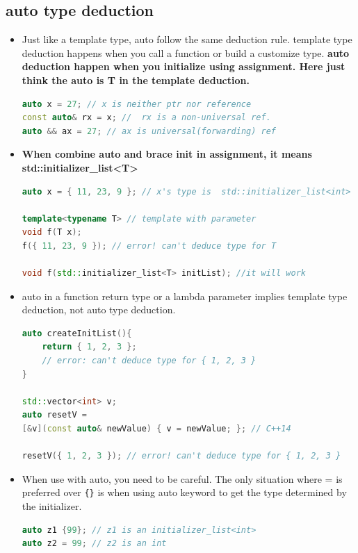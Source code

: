 \documentclass[a4paper,11pt,twoside]{book}
\begin{document}
\subsection{auto type deduction}
\begin{itemize}
	\item Just like a template type, auto follow the same deduction rule. template type deduction happens when you call a function or build a customize type. \textbf{auto deduction happen when you initialize using assignment. Here just think the auto is T in the template deduction.}
	
\begin{lstlisting}[frame=single, language=c++]
auto x = 27; // x is neither ptr nor reference
const auto& rx = x; //  rx is a non-universal ref.
auto && ax = 27; // ax is universal(forwarding) ref
\end{lstlisting}
	
	\item \textbf{When combine auto and brace init in assignment, it means std::initializer\_list<T>}
	
\begin{lstlisting}[frame=single, language=c++]
auto x = { 11, 23, 9 }; // x's type is  std::initializer_list<int>

template<typename T> // template with parameter
void f(T x);
f({ 11, 23, 9 }); // error! can't deduce type for T
	
void f(std::initializer_list<T> initList); //it will work
\end{lstlisting}
	
	\item auto in a function return type or a lambda parameter implies template type deduction, not auto type deduction.
\begin{lstlisting}[frame=single, language=c++]
auto createInitList(){
	return { 1, 2, 3 }; 
	// error: can't deduce type for { 1, 2, 3 }
}
	
std::vector<int> v;
auto resetV =
[&v](const auto& newValue) { v = newValue; }; // C++14
	
resetV({ 1, 2, 3 }); // error! can't deduce type for { 1, 2, 3 }
\end{lstlisting}
	
	\item When use with auto, you need to be careful. The only situation where = is preferred over \verb={}= is when using auto keyword to get the type determined by the initializer.
\begin{lstlisting}[frame=single, language=c++]
auto z1 {99}; // z1 is an initializer_list<int>
auto z2 = 99; // z2 is an int


\end{lstlisting}
\end{itemize}
\end{document}
